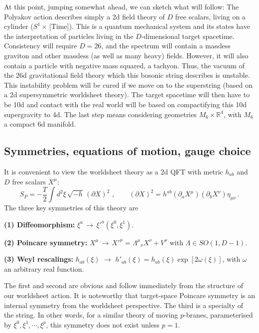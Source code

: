 \documentclass[12pt]{article}
\newcommand{\be}{\begin{equation}}
\newcommand{\ee}{\end{equation}}
\numberwithin{equation}{section}
\begin{document}
At this point, jumping somewhat ahead, we can sketch what will follow: The Polyakov action describes simply a 2d field theory of $D$ free scalars, living on a cylinder ($S^1\times\,\mbox{[Time]}$). This is a quantum mechanical system and its states have the interpretation of particles living in the  $D$-dimensional target spacetime. Consistency will require $D=26$, and the spectrum will contain a massless graviton and other massless (as well as many heavy) fields. However, it will also contain a particle with negative mass squared, a tachyon. Thus, the vacuum of the 26d gravitational field theory which this bosonic string describes is unstable. This instability problem will be cured if we move on to the superstring (based on a 2d supersymmetric worldsheet theory). The target spacetime will then have to be 10d and contact with the real world will be based on compactifying this 10d supergravity to 4d. The last step means considering geometries $M_6\times \mathbb{R}^4$, with $M_6$ a compact 6d manifold. 







\subsection{Symmetries, equations of motion, gauge choice}

It is convenient to view the worldsheet theory as a 2d QFT with metric $h_{ab}$ and $D$ free scalars $X^\mu$:
\be
S_P=-\frac{T}{2}\int d^2\xi\,\sqrt{-h}\,(\partial X)^2\,\,,\qquad
(\partial X)^2=h^{ab}(\partial_a X^\mu)(\partial_b X^\nu)\eta_{\mu\nu}\,.
\ee
The three key symmetries of this theory are

\noindent
{\bf (1) Diffeomorphism:}$\,\,\xi^a\,\to\,\xi'^a(\xi^0,\xi^1).$

\noindent
{\bf (2) Poincare symmetry:}$\,\,X^\mu\,\to\,X'^\mu=\Lambda^\mu{}_\nu X^\nu+V^\nu\,\,$with$\,\,\Lambda\in SO(1,D-1)$.

\noindent
{\bf (3) Weyl rescalings:}$\,\,h_{ab}(\xi)\,\,\to\,\,h'_{ab}(\xi)=h_{ab}(\xi) \exp[2\omega(\xi)]$, with $\omega$ an arbitrary real function.

The first and second are obvious and follow immediately from the structure of our worldsheet action. It is noteworthy that target-space Poincare symmetry is an internal symmetry from the worldsheet perspective. The third is a specialty of the string. In other words, for a similar theory of moving $p$-branes, parameterised by $\xi^0,\xi^1,\cdots,\xi^p$, this symmetry does not exist unless $p=1$. 
\end{document}
